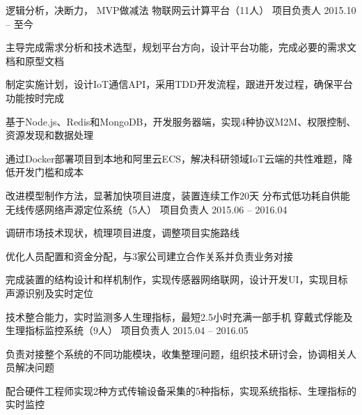 


\begin{cventries}


\cventry
{逻辑分析，决断力， MVP做减法} %
{物联网云计算平台（11人）} %
{项目负责人} %
{2015.10 -- 至今} %
{ %
\begin{cvitems}
\item {主导完成需求分析和技术选型，规划平台方向，设计平台功能，完成必要的需求文档和原型文档}
\item { 制定实施计划，设计IoT通信API，采用TDD开发流程，跟进开发过程，确保平台功能按时完成}
\item{基于Node.js、Redis和MongoDB，开发服务器端，实现4种协议M2M、权限控制、资源发现和数据处理}
\item{通过Docker部署项目到本地和阿里云ECS，解决科研领域IoT云端的共性难题，降低开发门槛和成本}
\end{cvitems}
}

\cventry
{改进模型制作方法，显著加快项目进度，装置连续工作20天} %
{分布式低功耗自供能无线传感网络声源定位系统（5人）} %
{项目负责人} %
{2015.06 -- 2016.04} %
{ %
\begin{cvitems}
\item {调研市场技术现状，梳理项目进度，调整项目实施路线}
\item {优化人员配置和资金分配，与3家公司建立合作关系并负责业务对接}
\item{完成装置的结构设计和样机制作，实现传感器网络联网，设计开发UI，实现目标声源识别及实时定位}
\end{cvitems} 
}

\cventry
{技术整合能力，实时监测多人生理指标，最短2.5小时充满一部手机} %
{穿戴式俘能及生理指标监控系统（9人）} %
{项目负责人} %
{2015.04 -- 2016.05} %
{ %
\begin{cvitems}
\item {负责对接整个系统的不同功能模块，收集整理问题，组织技术研讨会，协调相关人员解决问题}
\item {配合硬件工程师实现2种方式传输设备采集的5种指标，实现系统指标、生理指标的实时监控}
\end{cvitems} 
}


\end{cventries}

